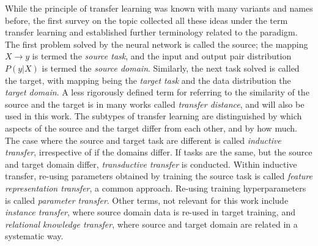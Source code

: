 \documentclass{article}
\begin{document}
While the principle of transfer learning was known with many variants and names before, the first survey on 
the topic \cite{transferlearning_survey} collected all these ideas under the term transfer learning and established further 
terminology related to the paradigm. The first problem solved by the neural network is called the source;
the mapping $X\to y$ is termed the \textit{source task}, and the input and output pair distribution $P(y|X)$ is termed the \textit{source domain}.
Similarly, the next task solved is called the target, with mapping being the \textit{target task} and the data distribution the \textit{target domain}.
A less rigorously defined term for referring to the similarity of the source and the target is in many works called \textit{transfer distance}, and will also be used in 
this work. The subtypes of transfer learning are distinguished by which aspects of 
the source and the target differ from each other, and by how much. The case where the 
source and target task are different is called \textit{inductive transfer}, 
irrespective of if the domains differ. If tasks are the same, but the source and target 
domain differ, \textit{transductive transfer} is conducted. Within inductive transfer, 
re-using parameters obtained by training the source task is called \textit{feature representation transfer},
a common approach. Re-using training hyperparameters is called \textit{parameter transfer}.
Other terms, not relevant for this work include \textit{instance transfer}, where source domain data 
is re-used in target training, and \textit{relational knowledge transfer}, where source and target 
domain are related in a systematic way.
\end{document}
